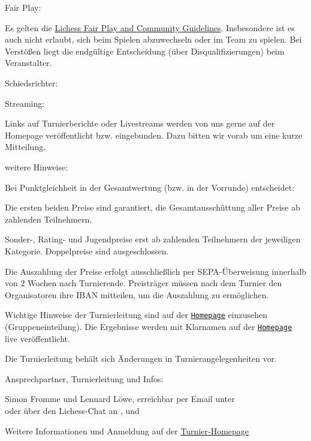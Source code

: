 \documentclass[paper=a4, fontsize=10pt]{scrartcl}
\begin{document}
\begin{basedescript}{\desclabelstyle{\multilinelabel}\desclabelwidth{10em}}
\item[Fair Play:]

  Es gelten die \href{\lichessTermsOfServiceURL}{Lichess Fair Play and
    Community Guidelines}. Insbesondere ist es auch nicht erlaubt,
  sich beim Spielen abzuwechseln oder im Team zu spielen. Bei
  Verstößen liegt die endgültige Entscheidung (über
  Disqualifizierungen) beim Veranstalter.

\item[Schiedsrichter:]

  \arbiter{}

\item[Streaming:]

  Links auf Turnierberichte oder Livestreams werden von uns gerne auf
  der Homepage veröffentlicht bzw. eingebunden. Dazu bitten wir vorab
  um eine kurze Mitteilung.

\item[weitere Hinweise:]

  Bei Punktgleichheit in der Gesamtwertung (bzw. in der Vorrunde)
  entscheidet:

  \enum{\tiebreak}

  Die ersten beiden Preise sind garantiert, die Gesamtausschüttung
  aller Preise ab \prizesGuaranteedMinParaticipants{} zahlenden
  Teilnehmern.

  Sonder-, Rating- und Jugendpreise erst ab
  \specialPrizesGuaranteedMinParaticipants{} zahlenden Teilnehmern der
  jeweiligen Kategorie. Doppelpreise sind ausgeschlossen.

  Die Auszahlung der Preise erfolgt ausschließlich per
  SEPA-Überweisung innerhalb von 2 Wochen nach
  Turnierende. Preisträger müssen nach dem Turnier den Organisatoren
  ihre IBAN mitteilen, um die Auszahlung zu ermöglichen.
  
  Wichtige Hinweise der Turnierleitung sind auf der
  \href{\tournamentURL}{\texttt{Homepage}} einzusehen
  (Gruppeneinteilung). Die Ergebnisse werden mit Klarnamen auf der
  \href{\tournamentURL}{\texttt{Homepage}} live veröffentlicht.

  Die Turnierleitung behält sich Änderungen in Turnierangelegenheiten
  vor.

\item[Ansprechpartner, Turnierleitung und Infos:]

  Simon Fromme und Lennard Löwe, erreichbar per Email unter
  \\ \email{\tournamentEmail} oder über den Lichess-Chat an
  ,  und

  Weitere Informationen und Anmeldung auf der
  \href{\tournamentURL}{Turnier-Homepage}
\end{basedescript}
\end{document}
